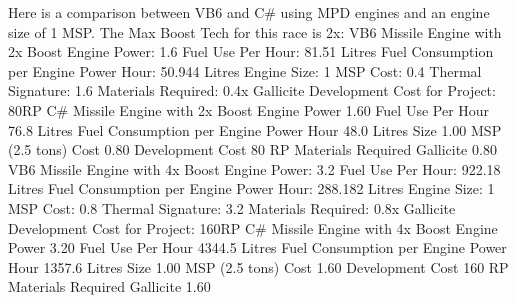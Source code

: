\documentclass[../Aurora C# unofficial manual.tex]{subfiles}
\begin{document}
	Here is a comparison between VB6 and C\# using MPD engines and an engine size of 1 MSP. The Max Boost Tech for this race is 2x:\newline\newline
	VB6 Missile Engine with 2x Boost\newline
	Engine Power: 1.6 \space\space\space Fuel Use Per Hour: 81.51 Litres\newline
	Fuel Consumption per Engine Power Hour: 50.944 Litres\newline
	Engine Size: 1 MSP \space\space\space Cost: 0.4\newline
	Thermal Signature: 1.6\newline
	Materials Required: 0.4x Gallicite\newline
	Development Cost for Project: 80RP\newline\newline
	C\# Missile Engine with 2x Boost
	Engine Power 1.60 \space\space\space Fuel Use Per Hour 76.8 Litres\newline
	Fuel Consumption per Engine Power Hour 48.0 Litres\newline
	Size 1.00 MSP (2.5 tons) \space\space\space Cost 0.80\newline
	Development Cost 80 RP\newline\newline
	Materials Required\newline
	Gallicite  0.80\newline\newline
	VB6 Missile Engine with 4x Boost\newline
	Engine Power: 3.2 \space\space\space Fuel Use Per Hour: 922.18 Litres\newline
	Fuel Consumption per Engine Power Hour: 288.182 Litres\newline
	Engine Size: 1 MSP \space\space\space Cost: 0.8\newline
	Thermal Signature: 3.2\newline
	Materials Required: 0.8x Gallicite\newline
	Development Cost for Project: 160RP\newline\newline
	C\# Missile Engine with 4x Boost\newline
	Engine Power 3.20 \space\space\space Fuel Use Per Hour 4344.5 Litres\newline
	Fuel Consumption per Engine Power Hour 1357.6 Litres\newline
	Size 1.00 MSP (2.5 tons) \space\space\space Cost 1.60\newline
	Development Cost 160 RP\newline\newline
	Materials Required\newline
	Gallicite  1.60
	
\end{document}
